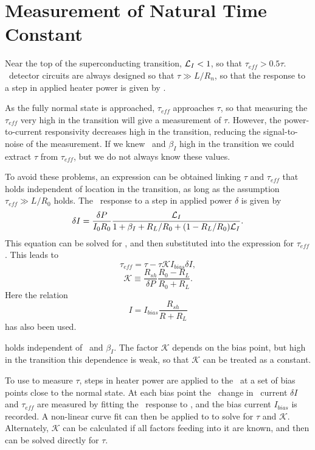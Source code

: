 \section{Measurement of Natural Time Constant}\label{sec:tau-nat-theory}

Near the top of the superconducting transition, $\mathcal{L}_I < 1$, so that $\tau_{eff} > 0.5 \tau$.
\TES\ detector circuits are always designed so that $\tau \gg L/R_n$, so that the response to a step in applied heater power is given by .

As the fully normal state is approached, $\tau_{eff}$ approaches $\tau$, so that measuring the $\tau_{eff}$ very high in the transition will give a measurement of $\tau$.
However, the power-to-current responsivity decreases high in the transition, reducing the signal-to-noise of the measurement.
If we knew \Loop\ and $\beta_I$ high in the transition we could extract $\tau$ from $\tau_{eff}$, but we do not always know these values.

To avoid these problems, an expression can be obtained linking $\tau$ and $\tau_{eff}$ that holds independent of location in the transition, as long as the assumption $\tau_{eff} \gg L/R_0$ holds.
The \DC\ response to a step in applied power $\delta $ is given by
\begin{equation}
\delta I = \frac{\delta P}{I_0 R_0}\frac{\mathcal{L}_I}{1 + \beta_I + R_L/R_0 + (1 - R_L / R_0)\mathcal{L}_I}.
\end{equation}
This equation can be solved for \Loop, and then substituted into the expression for $\tau_{eff}$.
This leads to
\begin{equation}\label{eqn:teff-from-tau}
\tau_{eff} = \tau - \tau \mathcal{K} I_{bias} \delta I,
\end{equation}
\begin{equation}
\mathcal{K} \equiv \frac{R_{sh}}{\delta P} \frac{R_0 - R_L}{R_0 + R_L}.
\end{equation}
Here the relation
\begin{equation}
I = I_{bias}\frac{R_{sh}}{R + R_L}
\end{equation}
has also been used.

 holds independent of \Loop\ and $\beta_I$.
The factor $\mathcal{K}$ depends on the bias point, but high in the transition this dependence is weak, so that $\mathcal{K}$ can be treated as a constant.

To use  to measure $\tau$, steps in heater power are applied to the \TES\ at a set of bias points close to the normal state.
At each bias point the \DC\ change in \TES\ current $\delta I$ and $\tau_{eff}$ are measured by fitting the \TES\ response to , and the bias current $I_{bias}$ is recorded.
A non-linear curve fit can then be applied to  to solve for $\tau$ and $\mathcal{K}$.
Alternately, $\mathcal{K}$ can be calculated if all factors feeding into it are known, and then  can be solved directly for $\tau$.

